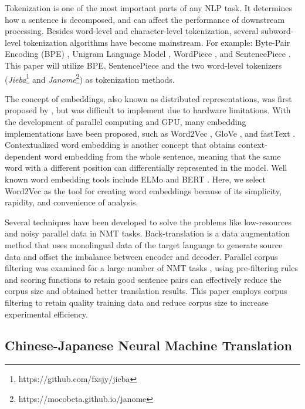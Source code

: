 Tokenization is one of the most important parts of any NLP task. It determines how a sentence is decomposed, and can affect the performance of downstream processing. Besides word-level and character-level tokenization, several subword-level tokenization algorithms have become mainstream. For example: Byte-Pair Encoding (BPE) \cite{sennrich_neural_2016}, Unigram Language Model \cite{kudo-2018-subword}, WordPiece \cite{6289079}, and SentencePiece \cite{kudo-richardson-2018-sentencepiece}. This paper will utilize BPE, SentencePiece \cite{sennrich_neural_2016, kudo-richardson-2018-sentencepiece} and the two word-level tokenizers (\textit{Jieba}\footnote{https://github.com/fxsjy/jieba} and \textit{Janome}\footnote{https://mocobeta.github.io/janome}) as tokenization methods.

The concept of embeddings, also known as distributed representations, was first proposed by \cite{hinton1986learning, bengio2003neural}, but was difficult to implement due to hardware limitations. With the development of parallel computing and GPU, many embedding implementations have been proposed, such as Word2Vec \cite{mikolov2013efficient}, GloVe \cite{pennington2014glove}, and fastText \cite{bojanowski2017enriching}.  Contextualized word embedding is another concept that obtains context-dependent word embedding from the whole sentence, meaning that the same word with a different position can differentially represented in the model.  Well known word embedding tools include ELMo \cite{peters-etal-2018-deep} and BERT \cite{devlin-etal-2019-bert}.  Here, we select Word2Vec \cite{mikolov2013efficient} as the tool for creating word embeddings because of its simplicity, rapidity, and convenience of analysis.

Several techniques have been developed to solve the problems like low-resources and noisy parallel data in NMT tasks. Back-translation \cite{sennrich-etal-2016-improving} is a data augmentation method that uses monolingual data of the target language to generate source data and offset the imbalance between encoder and decoder. Parallel corpus filtering was examined for a large number of NMT tasks \cite{koehn2018findings}, using pre-filtering rules and scoring functions to retain good sentence pairs can effectively reduce the corpus size and obtained better translation results. This paper employs corpus filtering to retain quality training data and reduce corpus size to increase experimental efficiency.

\subsection{Chinese-Japanese Neural Machine Translation}

